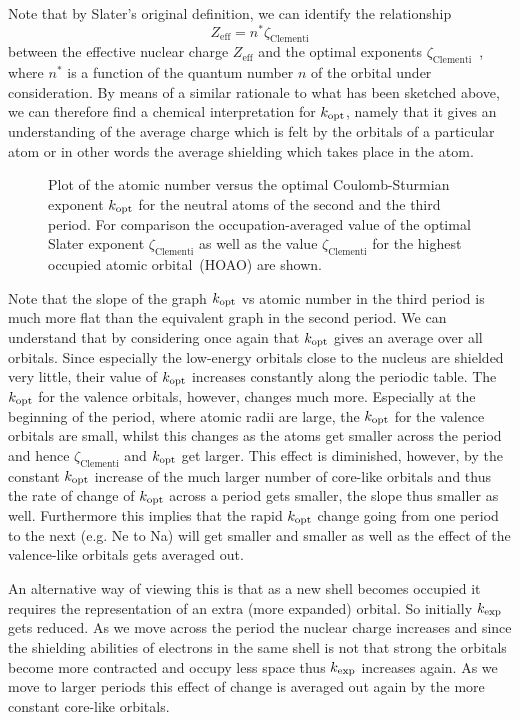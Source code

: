 Note that by Slater's original definition,
we can identify the relationship
\[ Z_\text{eff} = n^\ast \zeta_\text{Clementi} \]
between the effective nuclear charge $Z_\text{eff}$ and
the optimal exponents $\zeta_\text{Clementi}$~\cite{Slater1930},
where $n^\ast$ is a function of the quantum number $n$ of the orbital
under consideration.
By means of a similar rationale to what has been sketched above,
we can therefore find a chemical interpretation for $k_\text{opt}$,
namely that it gives an understanding of the average
charge which is felt by the orbitals of a particular atom
or in other words the average shielding which takes place in the atom.

\begin{figure}
	\centering
	\caption{Plot of the atomic number versus the optimal Coulomb-Sturmian exponent
		$k_\text{opt}$ for the neutral atoms of the second and the third period.
		For comparison the occupation-averaged value of the \citet{Clementi1963} optimal
		Slater exponent $\zeta_\text{Clementi}$ as well as the
		value $\zeta_\text{Clementi}$ for the highest occupied atomic orbital~(HOAO)
		are shown.
	}
	\label{fig:KoptVsAtnum}
\end{figure}

Note that the slope of the graph $k_\text{opt}$ vs atomic number in the third period
is much more flat than the equivalent graph in the second period.
We can understand that by considering once again
that $k_\text{opt}$ gives an average over all orbitals.
Since especially the low-energy orbitals close to the nucleus
are shielded very little,
their value of $k_\text{opt}$ increases constantly along the periodic table.
The $k_\text{opt}$ for the valence orbitals, however, changes much more.
Especially at the beginning of the period, where atomic radii are large,
the $k_\text{opt}$ for the valence orbitals are small,
whilst this changes as the atoms get smaller across the period
and hence $\zeta_\text{Clementi}$ and $k_\text{opt}$ get larger.
This effect is diminished, however,
by the constant $k_\text{opt}$ increase of the
much larger number of core-like orbitals
and thus the rate of change of $k_\text{opt}$ across a period gets smaller,
the slope thus smaller as well.
Furthermore this implies that the rapid $k_\text{opt}$ change
going from one period to the next (e.g. Ne to Na)
will get smaller and smaller as well
as the effect of the valence-like orbitals gets averaged out.

An alternative way of viewing this is
that as a new shell becomes occupied it requires
the representation of an extra (more expanded) orbital.
So initially $k_\text{exp}$ gets reduced.
As we move across the period the nuclear charge increases
and since the shielding abilities of electrons in the same shell
is not that strong the orbitals become more contracted and occupy less space
thus $k_\text{exp}$ increases again.
As we move to larger periods this effect of change is averaged out
again by the more constant core-like orbitals.

